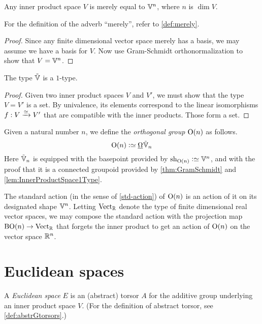 \begin{theorem}\label{thm:GramSchmidt}
  Any inner product space $V$ is merely equal to $\mathbb V^n$, where $n$ is $\dim V$.
\end{theorem}

For the definition of the adverb ``merely'', refer to \cref{def:merely}.

\begin{proof}
  Since any finite dimensional vector space merely has a basis, we may assume
  we have a basis for $V$.  Now use Gram-Schmidt orthonormalization to show
  that $V = \mathbb V^n$.
\end{proof}

\begin{lemma}\label{lem:InnerProductSpace1Type}
  The type ${\tilde {\mathbb V}}$ is a $1$-type.
\end{lemma}

\begin{proof}
  Given two inner product spaces $V$ and $V'$, we must show that the type
  $V=V'$ is a set.  By univalence, its elements correspond to the linear
  isomorphisms $f : V \xrightarrow {\simeq} V'$ that are compatible with the
  inner products.  Those form a set.
\end{proof}

\begin{definition}\label{def:OrthogonalGroup}
  Given a natural number $n$, we define the {\em orthogonal group} $\mathrm{O}(n)$
  as follows.
  $$\OrthGp n \defeq \mkgroup \OS_n$$
  Here ${\tilde {\mathbb V}}_n$ is equipped with the basepoint provided by $\sh_{\OrthGp n} \defeq \VV^n$, and with the
  proof that it is a connected groupoid provided by \cref{thm:GramSchmidt} and
  \cref{lem:InnerProductSpace1Type}.
\end{definition}

The standard action (in the sense of \cref{std-action}) of $\mathrm{O}(n)$ is an
action of it on its designated shape $\mathbb V^n$.  Letting $\mathrm{Vect}_{\mathbb{R}}$ denote
the type of finite dimensional real vector spaces, we may compose the standard
action with the projection map $\mathrm{B} \mathrm{O}(n) \to \mathrm{Vect}_{\mathbb{R}}$ that
forgets the inner product to get an action of $\mathrm{O}(n)$ on the vector space
$\mathbb{R}^n$.

\section{Euclidean spaces}

\begin{definition}\label{def:EuclideanSpace}
  A {\em Euclidean space} $E$ is an (abstract) torsor $A$ for the additive group
  underlying an inner product space $V$.  (For the definition of abstract
  torsor, see \cref{def:abstrGtorsors}.)
\end{definition}

